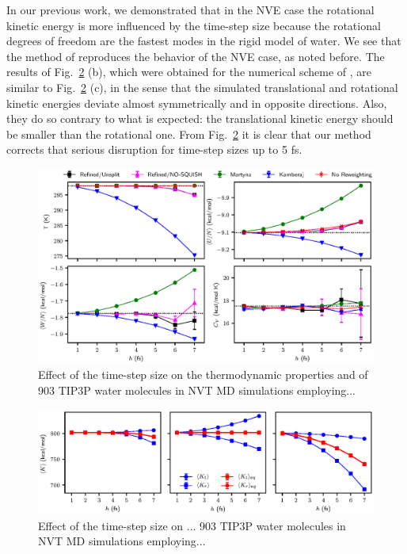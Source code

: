 \documentclass[
journal=jctcce,
layout=twocolumn
]{achemso}
\begin{document}
In our previous work\cite{Silveira_2017}, we demonstrated that in the NVE case the rotational kinetic energy is more influenced by the time-step size because the rotational degrees of freedom are the fastest modes in the rigid model of water. 
We see that the method of \citeauthor{Kamberaj_2005} \cite{Kamberaj_2005} reproduces the behavior of the NVE case, as noted before.
The results of Fig.~\ref{fig:energy_partition} (b), which were obtained for the numerical scheme of \citeauthor{Martyna_1996} \cite{Martyna_1996}, are similar to Fig.~\ref{fig:energy_partition} (c), in the sense that the simulated translational and rotational kinetic energies deviate almost symmetrically and in opposite directions. Also, they do so contrary to what is expected: the translational kinetic energy should be smaller than the rotational one.
From Fig.~\ref{fig:energy_partition} it is clear that our method corrects that serious disruption for time-step sizes up to 5 fs.


\begin{figure}
	\includegraphics{Figures/thermodynamic_properties.eps}
	\caption{Effect of the time-step size on the thermodynamic properties and of 903 TIP3P\cite{Jorgensen_1983} water molecules in NVT MD simulations employing...}
	\label{fig:properties}
\end{figure}

\begin{figure}
	\includegraphics{Figures/energy_partition.eps}
		\caption{Effect of the time-step size on ... 903 TIP3P\cite{Jorgensen_1983} water molecules in NVT MD simulations employing...}
	\label{fig:energy_partition}
\end{figure}
\end{document}
